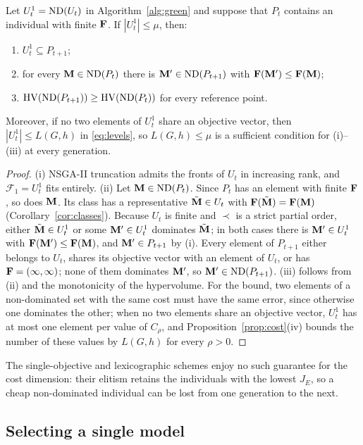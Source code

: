\begin{theorem}\label{thm:elitism}
Let $U_t^1=\operatorname{ND}(U_t)$ in Algorithm~\ref{alg:green} and suppose that $P_t$ contains an individual with finite $\mathbf{F}$.
If $|U_t^1|\le\mu$, then:
\begin{enumerate}
\item[(i)] $U_t^1\subseteq P_{t+1}$;
\item[(ii)] for every $\mathbf{M}\in\operatorname{ND}(P_t)$ there is $\mathbf{M}'\in\operatorname{ND}(P_{t+1})$ with $\mathbf{F}(\mathbf{M}')\le\mathbf{F}(\mathbf{M})$;
\item[(iii)] $\operatorname{HV}(\operatorname{ND}(P_{t+1}))\ge\operatorname{HV}(\operatorname{ND}(P_t))$ for every reference point.
\end{enumerate}
Moreover, if no two elements of $U_t^1$ share an objective vector, then $|U_t^1|\le L(G,h)$ in \eqref{eq:levels},
so $L(G,h)\le\mu$ is a sufficient condition for (i)--(iii) at every generation.
\end{theorem}
\begin{proof}
(i) NSGA-II truncation admits the fronts of $U_t$ in increasing rank, and $\mathcal F_1=U_t^1$ fits entirely.
(ii) Let $\mathbf{M}\in\operatorname{ND}(P_t)$. Since $P_t$ has an element with finite $\mathbf{F}$, so does $\mathbf{M}$. Its class has a representative
$\tilde{\mathbf{M}}\in U_t$ with $\mathbf{F}(\tilde{\mathbf{M}})=\mathbf{F}(\mathbf{M})$ (Corollary~\ref{cor:classes}). Because $U_t$ is finite and $\prec$ is a
strict partial order, either $\tilde{\mathbf{M}}\in U_t^1$ or some $\mathbf{M}'\in U_t^1$ dominates $\tilde{\mathbf{M}}$; in both cases there is
$\mathbf{M}'\in U_t^1$ with $\mathbf{F}(\mathbf{M}')\le\mathbf{F}(\mathbf{M})$, and $\mathbf{M}'\in P_{t+1}$ by (i). Every element of $P_{t+1}$ either belongs to
$U_t$, shares its objective vector with an element of $U_t$, or has $\mathbf{F}=(\infty,\infty)$; none of them dominates
$\mathbf{M}'$, so $\mathbf{M}'\in\operatorname{ND}(P_{t+1})$.
(iii) follows from (ii) and the monotonicity of the hypervolume.
For the bound, two elements of a non-dominated set with the same cost must have the same error, since otherwise one
dominates the other; when no two elements share an objective vector, $U_t^1$ has at most one element per value of $C_\rho$,
and Proposition~\ref{prop:cost}(iv) bounds the number of these values by $L(G,h)$ for every $\rho>0$.
\end{proof}

The single-objective and lexicographic schemes enjoy no such guarantee for the cost dimension: their elitism retains
the individuals with the lowest $J_E$, so a cheap non-dominated individual can be lost from one generation to the next.

\subsection{Selecting a single model}

